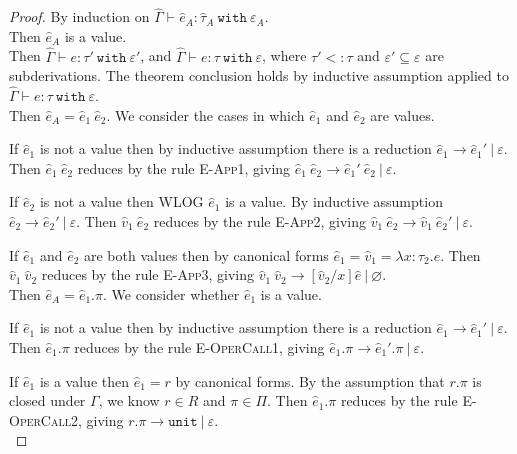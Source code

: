 \documentclass{llncs}
\newcommand{\keywadj}[1]{\mathtt{#1}}
\newcommand{\keyw}[1]{\keywadj{#1}~}
\newcommand{\kw}[1]{\keyw{ #1 }}
\newcommand{\kwa}[1]{\keywadj{ #1 }}
\begin{document}
\begin{proof}
By induction on $\hat \Gamma \vdash \hat e_A: \hat \tau_A~\kw{with} \varepsilon_A$.\\

\noindent
{}
Then $\hat e_A$ is a value. \\

\noindent
{}
Then $\hat \Gamma \vdash e: \tau'~\kw{with} \varepsilon'$, and $\hat \Gamma \vdash e: \tau~\kw{with} \varepsilon$, where $\tau' <: \tau$ and $\varepsilon' \subseteq \varepsilon$ are subderivations. The theorem conclusion holds by inductive assumption applied to $\hat \Gamma \vdash e: \tau~\kw{with} \varepsilon$.\\

\noindent
{}
Then $\hat e_A = \hat e_1~\hat e_2$. We consider the cases in which $\hat e_1$ and $\hat e_2$ are values.

If $\hat e_1$ is not a value then by inductive assumption there is a reduction $\hat e_1 \longrightarrow \hat e_1'~|~\varepsilon$. Then $\hat e_1~\hat e_2$ reduces by the rule \textsc{E-App1}, giving $\hat e_1~\hat e_2 \longrightarrow \hat e_1'~\hat e_2~|~\varepsilon$.

If $\hat e_2$ is not a value then WLOG $\hat e_1$ is a value. By inductive assumption $\hat e_2 \longrightarrow \hat e_2'~|~\varepsilon$. Then $\hat v_1~\hat e_2$ reduces by the rule \textsc{E-App2}, giving $\hat v_1~\hat e_2 \longrightarrow \hat v_1~\hat e_2'~|~\varepsilon$.

If $\hat e_1$ and $\hat e_2$ are both values then by canonical forms $\hat e_1 = \hat v_1 = \lambda x: \tau_2.e$. Then $\hat v_1~\hat v_2$ reduces by the rule \textsc{E-App3}, giving $\hat v_1~\hat v_2 \longrightarrow [\hat v_2/x]\hat e ~|~\varnothing$. \\

\noindent
{} Then $\hat e_A = \hat e_1.\pi$. We consider whether $\hat e_1$ is a value.

If $\hat e_1$ is not a value then by inductive assumption there is a reduction $\hat e_1 \longrightarrow \hat e_1'~|~\varepsilon$. Then $\hat e_1.\pi$ reduces by the rule \textsc{E-OperCall1}, giving $\hat e_1.\pi \longrightarrow \hat e_1'.\pi~|~\varepsilon$.

If $\hat e_1$ is a value then $\hat e_1 = r$ by canonical forms. By the assumption that $r.\pi$ is closed under $\Gamma$, we know $r \in R$ and $\pi \in \Pi$. Then $\hat e_1.\pi$ reduces by the rule \textsc{E-OperCall2}, giving $r.\pi \longrightarrow \kwa{unit}~|~\varepsilon$. \\


\end{proof}
\end{document}
